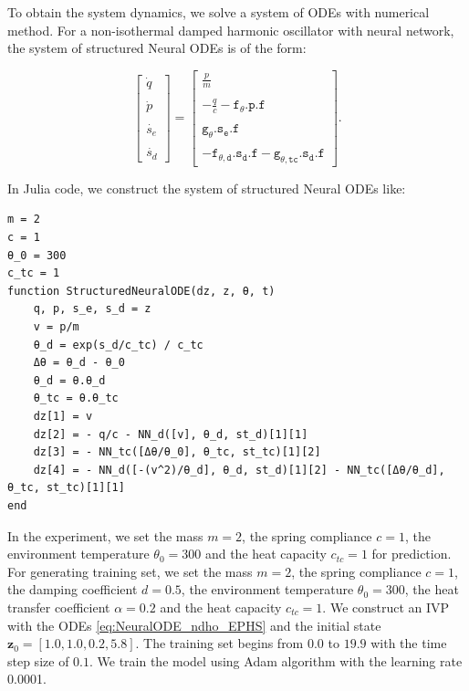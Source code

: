 \documentclass[
	parskip, 			   %
	twoside, 			   %
	DIV=14, 			   %
	BCOR=15.0mm, 		   %
	headsepline, 		   %
	open=right, 		   %
	captions=tableheading, %
	bibliography=totoc,    %
	numbers=noenddot       %
]{scrreprt}
\begin{document}
To obtain the system dynamics, we solve a system of ODEs with numerical method. For a non-isothermal damped harmonic oscillator with neural network, the system of structured Neural ODEs is of the form:

\begin{equation}
    \label{eq:NeuralODE_ndho_EPHS}
    \begin{bmatrix}
    \dot{q}\\\\
    \dot{p}\\\\
    \dot{s_e}\\\\
    \dot{s_d}
    \end{bmatrix}
    =
    \begin{bmatrix}
    \frac{p}{m}\\\\
    -\frac{q}{c}-\mathtt{f_{\theta}.p.f}\\\\
    \mathtt{g_{\theta}.s_{e}.f}\\\\
    -\mathtt{f_{\theta, d}.s_{d}.f}-\mathtt{g_{\theta, tc}.s_{d}.f}
    \end{bmatrix}.
\end{equation}

In Julia code, we construct the system of structured Neural ODEs like:

\begin{verbatim}
m = 2
c = 1
θ_0 = 300
c_tc = 1
function StructuredNeuralODE(dz, z, θ, t)
    q, p, s_e, s_d = z
    v = p/m
    θ_d = exp(s_d/c_tc) / c_tc
    Δθ = θ_d - θ_0
    θ_d = θ.θ_d
    θ_tc = θ.θ_tc   
    dz[1] = v
    dz[2] = - q/c - NN_d([v], θ_d, st_d)[1][1]
    dz[3] = - NN_tc([Δθ/θ_0], θ_tc, st_tc)[1][2]
    dz[4] = - NN_d([-(v^2)/θ_d], θ_d, st_d)[1][2] - NN_tc([Δθ/θ_d], θ_tc, st_tc)[1][1]
end
\end{verbatim}

In the experiment, we set the mass $m=2$, the spring compliance $c=1$, the environment temperature $\theta_{0}=300$ and the heat capacity $c_{tc}=1$ for prediction. For generating training set, we set the mass $m=2$, the spring compliance $c=1$, the damping coefficient $d=0.5$, the environment temperature $\theta_{0}=300$, the heat transfer coefficient $\alpha=0.2$ and the heat capacity $c_{tc}=1$. We construct an IVP with the ODEs \ref{eq:NeuralODE_ndho_EPHS} and the initial state $\mathbf{z}_{0} = [1.0, 1.0, 0.2, 5.8]$. The training set begins from $0.0$ to $19.9$ with the time step size of $0.1$. We train the model using Adam algorithm with the learning rate 0.0001.
\end{document}
